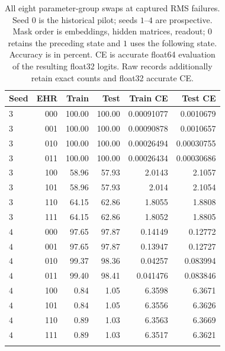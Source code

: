 \begin{table}[htbp]
\centering\small
\setlength{\tabcolsep}{4pt}
\caption{All eight parameter-group swaps at captured RMS failures. Seed $0$ is the historical pilot; seeds $1$--$4$ are prospective. Mask order is embeddings, hidden matrices, readout; $0$ retains the preceding state and $1$ uses the following state. Accuracy is in percent. CE is accurate float64 evaluation of the resulting float32 logits. Raw records additionally retain exact counts and float32 accurate CE.}
\label{tab:rms-swaps-2}
\begin{tabular}{lrrrrr}
\toprule
Seed & EHR & Train & Test & Train CE & Test CE \\
\midrule
$3$ & 000 & 100.00 & 100.00 & 0.00091077 & 0.0010679 \\
$3$ & 001 & 100.00 & 100.00 & 0.00090878 & 0.0010657 \\
$3$ & 010 & 100.00 & 100.00 & 0.00026494 & 0.00030755 \\
$3$ & 011 & 100.00 & 100.00 & 0.00026434 & 0.00030686 \\
$3$ & 100 & 58.96 & 57.93 & 2.0143 & 2.1057 \\
$3$ & 101 & 58.96 & 57.93 & 2.014 & 2.1054 \\
$3$ & 110 & 64.15 & 62.86 & 1.8055 & 1.8808 \\
$3$ & 111 & 64.15 & 62.86 & 1.8052 & 1.8805 \\
\addlinespace
$4$ & 000 & 97.65 & 97.87 & 0.14149 & 0.12772 \\
$4$ & 001 & 97.65 & 97.87 & 0.13947 & 0.12727 \\
$4$ & 010 & 99.37 & 98.36 & 0.04257 & 0.083994 \\
$4$ & 011 & 99.40 & 98.41 & 0.041476 & 0.083846 \\
$4$ & 100 & 0.84 & 1.05 & 6.3598 & 6.3671 \\
$4$ & 101 & 0.84 & 1.05 & 6.3556 & 6.3626 \\
$4$ & 110 & 0.89 & 1.03 & 6.3563 & 6.3669 \\
$4$ & 111 & 0.89 & 1.03 & 6.3517 & 6.3621 \\
\addlinespace
\bottomrule
\end{tabular}
\end{table}
